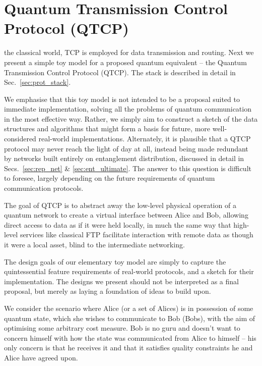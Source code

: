%
%

\section{Quantum Transmission Control Protocol (QTCP)} \label{sec:QTCP}

 the classical world, TCP is employed for data transmission and routing. Next we present a simple toy model for a proposed quantum equivalent -- the Quantum Transmission Control Protocol (QTCP). The stack is described in detail in Sec.~\ref{sec:prot_stack}.

We emphasise that this toy model is not intended to be a proposal suited to immediate implementation, solving all the problems of quantum communication in the most effective way. Rather, we simply aim to construct a sketch of the data structures and algorithms that might form a basis for future, more well-considered real-world implementations. Alternately, it is plausible that a QTCP protocol may never reach the light of day at all, instead being made redundant by networks built entirely on entanglement distribution, discussed in detail in Secs.~\ref{sec:rep_net} \& \ref{sec:ent_ultimate}. The answer to this question is difficult to foresee, largely depending on the future requirements of quantum communication protocols.

The goal of QTCP is to abstract away the low-level physical operation of a quantum network to create a virtual interface between Alice and Bob, allowing direct access to data as if it were held locally, in much the same way that high-level services like classical FTP facilitate interaction with remote data as though it were a local asset, blind to the intermediate networking.

The design goals of our elementary toy model are simply to capture the quintessential feature requirements of real-world protocols, and a sketch for their implementation. The designs we present should not be interpreted as a final proposal, but merely as laying a foundation of ideas to build upon.

We consider the scenario where Alice (or a set of Alices) is in possession of some quantum state, which she wishes to communicate to Bob (Bobs), with the aim of optimising some arbitrary cost measure. Bob is no guru and doesn't want to concern himself with how the state was communicated from Alice to himself -- his only concern is that he receives it and that it satisfies quality constraints he and Alice have agreed upon.
 
